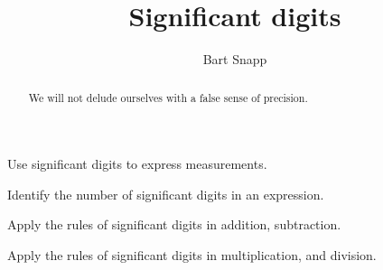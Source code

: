 \documentclass[handout,noauthor,nooutcomes,hints,12pt]{ximera}
\title{Significant digits}
\author{Bart Snapp}
\begin{document}
\begin{abstract}
We will not delude ourselves with a false sense of precision. 
\end{abstract}
\maketitle


\begin{listOutcomes}
  \item Use significant digits to express measurements.
  \item Identify the number of significant digits in an expression.
  \item Apply the rules of significant digits in addition, subtraction.
  \item Apply the rules of significant digits in multiplication, and division.
\end{listOutcomes}

\mynewpage
\end{document}
